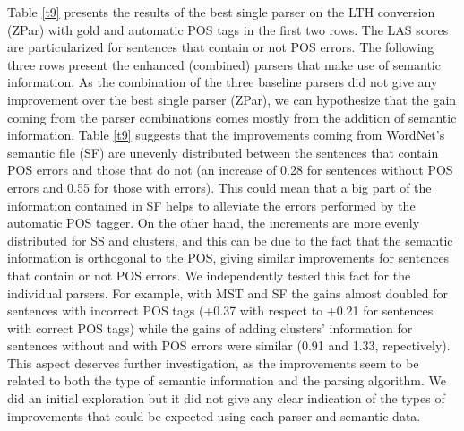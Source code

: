 \documentclass[11pt]{article}
\begin{document}
Table \ref{t9} presents the results of the best single parser on the LTH conversion (ZPar) with 
gold and automatic POS tags in the first two rows. The LAS scores are particularized for sentences 
that contain or not POS errors. The following three rows present the enhanced (combined) parsers 
that make use of semantic information. As the combination of the three baseline parsers did not 
give any improvement over the best single parser (ZPar), we can hypothesize that the gain coming 
from the parser combinations comes mostly from the addition of semantic information.
Table \ref{t9} suggests that the improvements coming from WordNet's semantic file (SF) are 
unevenly distributed between the sentences that contain POS errors and those that 
do not (an increase of 0.28 for sentences without POS errors and 0.55 for those with errors). This 
could mean that a big part of the information contained  in SF helps to alleviate the errors 
performed by the automatic POS tagger. On the other hand, the increments are more evenly 
distributed for SS and clusters, and this can be due to the fact that the semantic 
information is orthogonal to the POS, giving similar improvements for sentences that 
contain or not POS errors. We independently tested this fact for the individual parsers. For 
example, with MST and SF the gains almost doubled  for sentences with incorrect 
POS tags (+0.37 with respect to +0.21 for sentences with correct POS tags) while 
the gains of adding clusters' information for sentences without and with POS errors 
were similar (0.91 and 1.33, repectively). This aspect deserves further 
investigation, as the improvements seem to be related to both the type of semantic 
information and the parsing algorithm.%
We did an initial exploration but it did not give any clear indication of the types 
of improvements that could be expected using each parser and semantic data.
\end{document}
